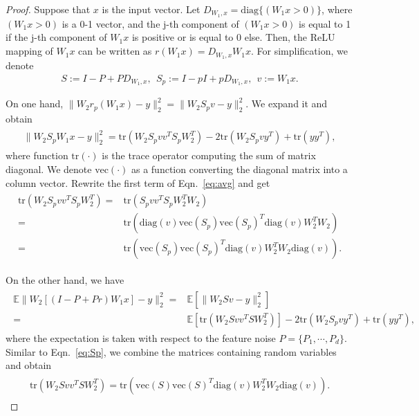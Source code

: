 \documentclass[11pt]{article}
\begin{document}
\begin{proof}
Suppose that $x$ is the input vector. Let $D_{W_1,x} = \text{diag}\{(W_1x>0)\}$, where $(W_1x>0)$ is a 0-1 vector, and the j-th component of $(W_1x>0)$ is equal to 1 if the j-th component of $W_1x$ is positive or is equal to 0 else. Then, the ReLU mapping of $W_1x$ can be written as $r(W_1x)=D_{W_1,x}W_1x$. For simplification, we denote
\begin{align*}
S := I-P+PD_{W_1,x}, \ \ S_p:= I-pI+pD_{W_1,x}, \ \ v := W_1x.
\end{align*}

On one hand, $\|W_2r_p(W_1x) - y\|_2^2 = \|W_2S_pv-y\|_2^2$. We expand it and obtain
\begin{align}
\begin{split}
\|W_2S_pW_1x-y\|_2^2 = \text{tr}(W_2S_pvv^TS_pW_2^T)-2\text{tr}(W_2S_pvy^T)+\text{tr}(yy^T),
\end{split}
\label{eq:avg}
\end{align}
where function $\text{tr}(\cdot)$ is the trace operator computing the sum of matrix diagonal. We denote $\text{vec}(\cdot)$ as a function converting the diagonal matrix into a column vector. Rewrite the first term of Eqn.~\eqref{eq:avg} and get
\begin{align}
\begin{split}
\text{tr}(W_2S_pvv^TS_pW_2^T) = &\text{tr}(S_pvv^TS_pW_2^TW_2)
\\ = &\text{tr}(\text{diag}(v)\text{vec}(S_p)\text{vec}(S_p)^T\text{diag}(v)W_2^TW_2)
\\ = &\text{tr}(\text{vec}(S_p)\text{vec}(S_p)^T\text{diag}(v)W_2^TW_2\text{diag}(v)).
\end{split}
\label{eq:Sp}
\end{align}

On the other hand, we have
\begin{align}
\begin{split}
\mathbb{E}\|W_2[(I-P+Pr)W_1x] - y\|_2^2 =& \mathbb{E}[\|W_2Sv-y\|_2^2]
\\ =& \mathbb{E}[\text{tr}(W_2Svv^TSW_2^T)]-2\text{tr}(W_2S_pvy^T)+\text{tr}(yy^T),
\end{split}
\label{eq:not_avg}
\end{align}
where the expectation is taken with respect to the feature noise $P = \{P_1,\cdots,P_d\}.$ Similar to Eqn.~\eqref{eq:Sp}, we combine the matrices containing random variables and obtain
\begin{align}
\begin{split}
\text{tr}(W_2Svv^TSW_2^T) = \text{tr}(\text{vec}(S)\text{vec}(S)^T\text{diag}(v)W_2^TW_2\text{diag}(v)).
\end{split}
\label{eq:S}
\end{align}


\end{proof}
\end{document}
